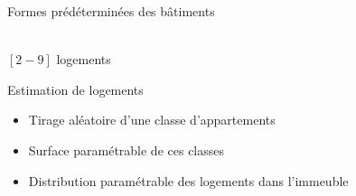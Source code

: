 \documentclass[xcolor=table]{beamer}
\begin{document}
\begin{frame}{Formes prédéterminées des bâtiments}
{\begin{block}{}
		\\
		{\footnotesize $[2-9]$ logements}	
	\end{block}}

\end{frame}

\begin{frame}{Estimation de logements}
	\begin{itemize}
		\item Tirage aléatoire d'une classe d'appartements
		\item Surface paramétrable de ces classes
		\item Distribution paramétrable des logements dans l'immeuble 
	\end{itemize}
\end{frame}
\end{document}
